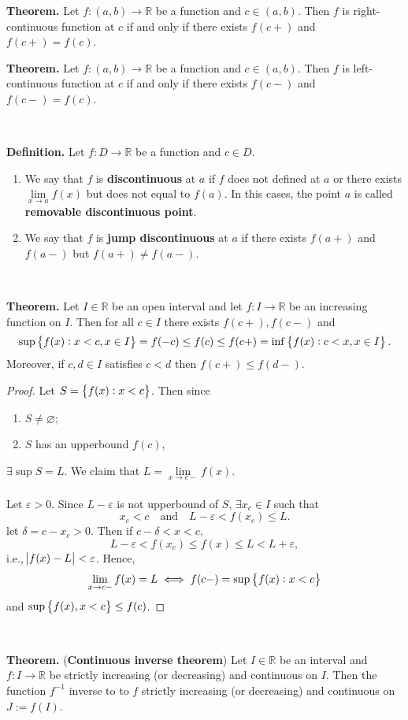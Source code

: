 \documentclass[12pt,a4paper]{article}
\begin{document}
\begin{tcolorbox}[colback=white]
	\textbf{Theorem.} Let $f:(a,b)\to\mathbb{R}$ be a function and $c\in(a,b)$. Then $f$ is right-continuous function at $c$ if and only if there exists $f(c+)$ and $f(c+)=f(c)$.
\end{tcolorbox}
\begin{tcolorbox}[colback=white]
	\textbf{Theorem.} Let $f:(a,b)\to\mathbb{R}$ be a function and $c\in(a,b)$. Then $f$ is left-continuous function at $c$ if and only if there exists $f(c-)$ and $f(c-)=f(c)$.
\end{tcolorbox}
\
\begin{tcolorbox}[colback=white]
	\textbf{Definition.} Let $f:D\to\mathbb{R}$ be a function and $c\in D$. \begin{enumerate}
		\item We say that $f$ is \textbf{discontinuous} at $a$ if $f$ does not defined at $a$ or there exists $\lim\limits_{x\to a}f(x)$ but does not equal to $f(a)$. In this cases, the point $a$ is called \textbf{removable discontinuous point}.
		\item We say that $f$ is \textbf{jump discontinuous} at $a$ if there exists $f(a+)$ and $f(a-)$ but $f(a+)\neq f(a-)$.
	\end{enumerate}
\end{tcolorbox}
\
\begin{tcolorbox}[colback=white]
	\textbf{Theorem.} Let $I\in\mathbb{R}$ be an open interval and let $f:I\to\mathbb{R}$ be an increasing function on $I$. Then for all $c\in I$ there exists $f(c+),f(c-)$ and \[
	\sup\set{f(x):x<c, x\in I}=f(-c)\leq f(c)\leq f(c+) = \inf\set{f(x):c<x, x\in I}.
	\] Moreover, if $c,d\in I$ satisfies $c<d$ then $f(c+)\leq f(d-)$.\tcblower\begin{proof}
		Let $S=\set{f(x):x<c}$. Then since \begin{enumerate}
			\item $S\neq\varnothing$;
			\item $S$ has an upperbound $f(c)$,
		\end{enumerate} $\exists\sup S=L$. We claim that $L=\lim\limits_{x\to c-}f(x)$.\\
	\\ Let $\varepsilon>0$. Since $L-\varepsilon$ is not upperbound of $S$, $\exists x_c\in I$ such that \[
	x_c<c\quad\text{and}\quad L-\varepsilon<f(x_c)\leq L.
	\] let $\delta=c-x_c>0$. Then if $c-\delta<x<c$, \[
	L-\varepsilon<f(x_c)\leq f(x)\leq L<L+\varepsilon,
	\] i.e., $\abs{f(x)-L}<\varepsilon$. Hence, \[
	\lim\limits_{x\to c-}f(x)=L\iff f(c-)=\sup\set{f(x):x<c}
	\] and $\sup\set{f(x),x<c}\leq f(c)$.
	\end{proof}
\end{tcolorbox}
\
\begin{tcolorbox}[colback=white]
	\textbf{Theorem.} (\textbf{Continuous inverse theorem}) Let $I\in\mathbb{R}$ be an interval and $f:I\to\mathbb{R}$ be strictly increasing (or decreasing) and continuous on $I$. Then the function $f^{-1}$ inverse to to $f$ strictly increasing (or decreasing) and continuous on $J:=f(I)$.
\end{tcolorbox}
\end{document}
